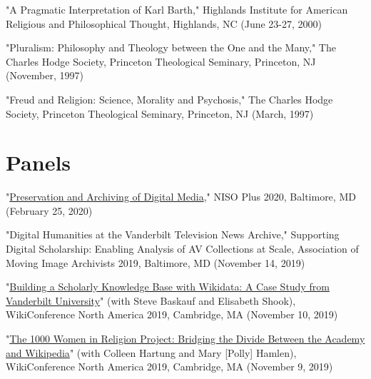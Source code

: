 \documentclass[10pt]{res} %
\begin{document}
\begin{resume}
\begin{hangparas}{.25in}{1}"A Pragmatic Interpretation of Karl Barth," Highlands Institute for American Religious and Philosophical Thought, Highlands, NC (June 23-27, 2000)\end{hangparas}

\begin{hangparas}{.25in}{1}"Pluralism: Philosophy and Theology between the One and the Many," The Charles Hodge Society, Princeton Theological Seminary, Princeton, NJ (November, 1997)\end{hangparas}

\begin{hangparas}{.25in}{1}"Freud and Religion: Science, Morality and Psychosis," The Charles Hodge Society, Princeton Theological Seminary, Princeton, NJ (March, 1997)\end{hangparas}

\section{Panels}

\begin{hangparas}{.25in}{1}"\href{https://nisoplus20.sched.com/event/YiQG/preservation-and-archiving-of-digital-media}{Preservation and Archiving of Digital Media}," NISO Plus 2020, Baltimore, MD (February 25, 2020)\end{hangparas}

\begin{hangparas}{.25in}{1}"Digital Humanities at the Vanderbilt Television News Archive," Supporting Digital Scholarship: Enabling Analysis of AV Collections at Scale, Association of Moving Image Archivists 2019, Baltimore, MD (November 14, 2019)\end{hangparas}

\begin{hangparas}{.25in}{1}"\href{https://wikiconference.org/wiki/Submissions:2019/Building_a_Scholarly_Knowledge_Base_with_Wikidata:_A_Case_Study_from_Vanderbilt_University}{Building a Scholarly Knowledge Base with Wikidata: A Case Study from Vanderbilt University}" (with Steve Baskauf and Elisabeth Shook), WikiConference North America 2019, Cambridge, MA (November 10, 2019)\end{hangparas}

\begin{hangparas}{.25in}{1}"\href{https://wikiconference.org/wiki/Submissions:2019/The_1000_Women_in_Religion_Project:_Bridging_the_Divide_Between_the_Academy_and_Wikipedia}{The 1000 Women in Religion Project: Bridging the Divide Between the Academy and Wikipedia}" (with Colleen Hartung and Mary [Polly] Hamlen), WikiConference North America 2019, Cambridge, MA (November 9, 2019)\end{hangparas}


\end{resume}
\end{document}
